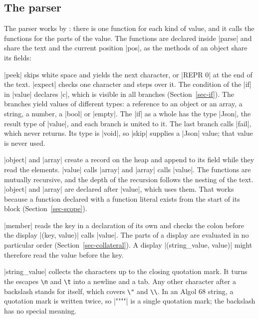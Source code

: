 \subsection*{The parser}

The parser works by : there is one function for
each kind of value, and it calls the functions for the parts of the
value. The functions are declared inside \code|parse| and share the text
and the current position \code|pos|, as the methods of an object share
its fields:


\code|peek| skips white space and yields the next character, or
\code|REPR 0| at the end of the text. \code|expect| checks one character
and steps over it. The condition of the \code|if| in \code|value|
declares \code|c|, which is visible in all branches
(Section~\ref{sec-if}). The branches yield values of different types: a
reference to an object or an array, a string, a number, a \code|bool|
or \code|empty|. The \code|if| as a whole has the type \code|Json|, the
result type of \code|value|, and each branch is united to it. The last
branch calls \code|fail|, which never returns. Its type is \code|void|,
so \code|skip| supplies a \code|Json| value; that value is never used.


\code|object| and \code|array| create a record on the heap and append to
its field while they read the elements. \code|value| calls \code|array|
and \code|array| calls \code|value|. The functions are mutually
recursive, and the depth of the recursion follows the nesting of the
text. \code|object| and \code|array| are declared after \code|value|,
which uses them. That works because a function declared with a function
literal exists from the start of its block (Section~\ref{sec-scope}).

\code|member| reads the key in a declaration of its own and checks the
colon before the display \code|(key, value)| calls \code|value|. The
parts of a display are evaluated in no particular order
(Section~\ref{sec-collateral}). A display \code|(string_value, value)|
might therefore read the value before the key.


\code|string_value| collects the characters up to the closing quotation
mark. It turns the escapes \texttt{\textbackslash n} and
\texttt{\textbackslash t} into a newline and a tab. Any other character
after a backslash stands for itself, which covers \texttt{\textbackslash"}
and \texttt{\textbackslash\textbackslash}. In an Algol 68 string, a
quotation mark is written twice, so \code|""""| is a single quotation
mark; the backslash has no special meaning.


